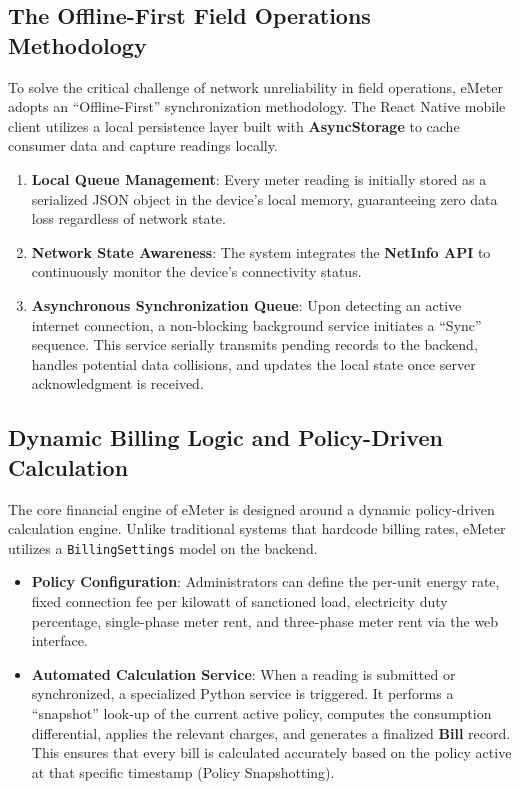 \documentclass[12pt, a4paper, onecolumn]{report}
\begin{document}
\subsection{The Offline-First Field Operations Methodology}
To solve the critical challenge of network unreliability in field operations, eMeter adopts an ``Offline-First'' synchronization methodology. The React Native mobile client utilizes a local persistence layer built with \textbf{AsyncStorage} to cache consumer data and capture readings locally.
\begin{enumerate}
    \item \textbf{Local Queue Management}: Every meter reading is initially stored as a serialized JSON object in the device's local memory, guaranteeing zero data loss regardless of network state.
    \item \textbf{Network State Awareness}: The system integrates the \textbf{NetInfo API} to continuously monitor the device's connectivity status.
    \item \textbf{Asynchronous Synchronization Queue}: Upon detecting an active internet connection, a non-blocking background service initiates a ``Sync'' sequence. This service serially transmits pending records to the backend, handles potential data collisions, and updates the local state once server acknowledgment is received.
\end{enumerate}

\subsection{Dynamic Billing Logic and Policy-Driven Calculation}
The core financial engine of eMeter is designed around a dynamic policy-driven calculation engine. Unlike traditional systems that hardcode billing rates, eMeter utilizes a \texttt{BillingSettings} model on the backend.
\begin{itemize}
    \item \textbf{Policy Configuration}: Administrators can define the per-unit energy rate, fixed connection fee per kilowatt of sanctioned load, electricity duty percentage, single-phase meter rent, and three-phase meter rent via the web interface.
    \item \textbf{Automated Calculation Service}: When a reading is submitted or synchronized, a specialized Python service is triggered. It performs a ``snapshot'' look-up of the current active policy, computes the consumption differential, applies the relevant charges, and generates a finalized \textbf{Bill} record. This ensures that every bill is calculated accurately based on the policy active at that specific timestamp (Policy Snapshotting).
\end{itemize}
\end{document}
